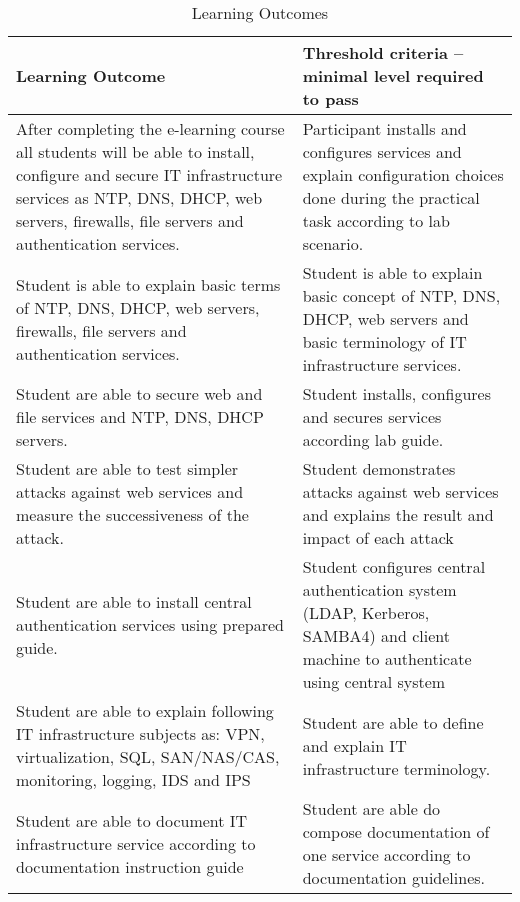 \begin{table}[h]
\centering
\caption{Learning Outcomes}
{ \small
\begin{tabular}{|p{7cm}|p{7cm}|}

\hline 
\color{blue} Learning Outcome &\color{blue}  Threshold criteria -- minimal level required to pass \\ 
\hline 

\hline 
After completing the e-learning course all students will be able to install, configure and secure  IT infrastructure services as \gls{NTP}, \gls{DNS}, \gls{DHCP}, web servers, firewalls, file servers and authentication services. & Participant installs and configures services and explain configuration choices done during the practical task according to lab scenario.\\ 
\hline 
Student is able to explain basic terms of \gls{NTP}, \gls{DNS}, \gls{DHCP}, web servers, firewalls, file servers and authentication services. 
& 

Student is able to explain basic concept of \gls{NTP}, \gls{DNS}, \gls{DHCP}, web servers and  basic terminology of IT infrastructure services.
\\ 
\hline 
Student are able to secure web and file services and \gls{NTP}, \gls{DNS}, \gls{DHCP} servers.

& 
Student installs, configures and secures services according lab guide.
\\ 
\hline 
Student are able to test simpler attacks against web services and measure the successiveness of the attack.

& Student demonstrates attacks against web services and explains the result and impact of each attack \\ 
\hline 
Student are able to install central authentication services using prepared guide.
& 
Student configures central authentication system (LDAP, Kerberos, SAMBA4) and client machine to authenticate using central system
\\
\hline 
Student are able to explain following IT infrastructure subjects as: VPN, virtualization, SQL, SAN/NAS/CAS, monitoring, logging, IDS and IPS
& 
Student are able to define and explain IT infrastructure terminology.
\\ 

\hline 
Student are able to document IT infrastructure service according to documentation instruction guide

& 

Student are able do compose documentation of one service according to documentation guidelines. 
\\ 
\hline 

\end{tabular} 
}
\label{tab:learning_outcomes}
\end{table}

